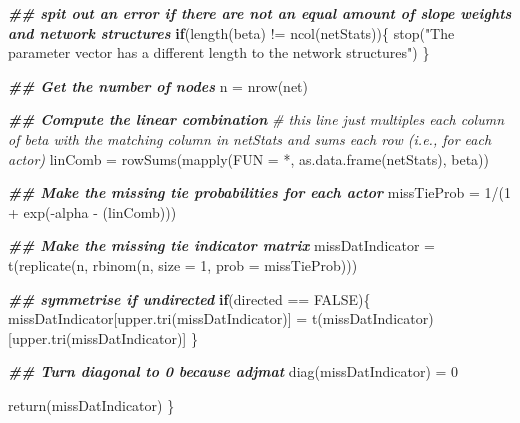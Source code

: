 \documentclass[
]{article}
\newenvironment{Shaded}{\begin{snugshade}}{\end{snugshade}}
\newcommand{\AttributeTok}[1]{\textcolor[rgb]{0.77,0.63,0.00}{#1}}
\newcommand{\CommentTok}[1]{\textcolor[rgb]{0.56,0.35,0.01}{\textit{#1}}}
\newcommand{\ConstantTok}[1]{\textcolor[rgb]{0.00,0.00,0.00}{#1}}
\newcommand{\ControlFlowTok}[1]{\textcolor[rgb]{0.13,0.29,0.53}{\textbf{#1}}}
\newcommand{\DecValTok}[1]{\textcolor[rgb]{0.00,0.00,0.81}{#1}}
\newcommand{\DocumentationTok}[1]{\textcolor[rgb]{0.56,0.35,0.01}{\textbf{\textit{#1}}}}
\newcommand{\FunctionTok}[1]{\textcolor[rgb]{0.00,0.00,0.00}{#1}}
\newcommand{\NormalTok}[1]{#1}
\newcommand{\OtherTok}[1]{\textcolor[rgb]{0.56,0.35,0.01}{#1}}
\newcommand{\SpecialCharTok}[1]{\textcolor[rgb]{0.00,0.00,0.00}{#1}}
\newcommand{\StringTok}[1]{\textcolor[rgb]{0.31,0.60,0.02}{#1}}
\begin{document}
\begin{Shaded}
\begin{Highlighting}[]
  \DocumentationTok{\#\# spit out an error if there are not an equal amount of slope weights and network structures}
  \ControlFlowTok{if}\NormalTok{(}\FunctionTok{length}\NormalTok{(beta) }\SpecialCharTok{!=} \FunctionTok{ncol}\NormalTok{(netStats))\{}
    \FunctionTok{stop}\NormalTok{(}\StringTok{"The parameter vector has a different length to the network structures"}\NormalTok{)}
\NormalTok{  \}}
  
  \DocumentationTok{\#\# Get the number of nodes}
\NormalTok{  n }\OtherTok{=} \FunctionTok{nrow}\NormalTok{(net)}
  
  \DocumentationTok{\#\# Compute the linear combination}
  \CommentTok{\# this line just multiples each column of beta with the matching column in netStats and sums each row (i.e., for each actor)}
\NormalTok{  linComb }\OtherTok{=} \FunctionTok{rowSums}\NormalTok{(}\FunctionTok{mapply}\NormalTok{(}\AttributeTok{FUN =} \StringTok{\textquotesingle{}*\textquotesingle{}}\NormalTok{, }\FunctionTok{as.data.frame}\NormalTok{(netStats), beta))}
    
  \DocumentationTok{\#\# Make the missing tie probabilities for each actor}
\NormalTok{  missTieProb }\OtherTok{=} \DecValTok{1}\SpecialCharTok{/}\NormalTok{(}\DecValTok{1} \SpecialCharTok{+} \FunctionTok{exp}\NormalTok{(}\SpecialCharTok{{-}}\NormalTok{alpha }\SpecialCharTok{{-}}\NormalTok{ (linComb)))}
  
  \DocumentationTok{\#\# Make the missing tie indicator matrix}
\NormalTok{  missDatIndicator }\OtherTok{=} \FunctionTok{t}\NormalTok{(}\FunctionTok{replicate}\NormalTok{(n, }\FunctionTok{rbinom}\NormalTok{(n, }\AttributeTok{size =} \DecValTok{1}\NormalTok{, }\AttributeTok{prob =}\NormalTok{ missTieProb)))}
  
  \DocumentationTok{\#\# symmetrise if undirected}
  \ControlFlowTok{if}\NormalTok{(directed }\SpecialCharTok{==} \ConstantTok{FALSE}\NormalTok{)\{}
\NormalTok{    missDatIndicator[}\FunctionTok{upper.tri}\NormalTok{(missDatIndicator)] }\OtherTok{=} \FunctionTok{t}\NormalTok{(missDatIndicator)[}\FunctionTok{upper.tri}\NormalTok{(missDatIndicator)]}
\NormalTok{  \}}
  
  \DocumentationTok{\#\# Turn diagonal to 0 because adjmat}
  \FunctionTok{diag}\NormalTok{(missDatIndicator) }\OtherTok{=} \DecValTok{0}
  
  \FunctionTok{return}\NormalTok{(missDatIndicator)}
\NormalTok{\}}
\end{Highlighting}
\end{Shaded}
\end{document}
